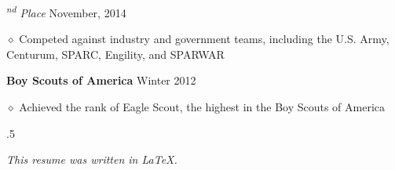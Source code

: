 \documentclass[executivepaper]{extarticle}
\begin{document}
\begin{center}
{\begin{minipage}{7.0in}
{\noindent \textit{\fontsize{12}{8}\textsuperscript{nd} Place}} {\hfill \fontsize{10}{8}\selectfont November, 2014}

\vspace{0.25mm}

{\noindent $\diamond$ {\fontsize{12}{8}\selectfont Competed against industry and government teams, including the U.S. Army, Centurum, SPARC, Engility, and SPARWAR}}

\vspace{2mm}

{\noindent \textbf{\fontsize{12}{8}\selectfont Boy Scouts of America}} {\hfill \fontsize{10}{8}\selectfont Winter 2012}

\vspace{0.25mm}

{\noindent $\diamond$ {\fontsize{12}{8}\selectfont Achieved the rank of Eagle Scout, the highest in the Boy Scouts of America}}

\vspace{5mm}



\moveleft.5\hoffset\centerline{{\large\sl This resume was written in \LaTeX.}}

\end{minipage}

}

\end{center}
\end{document}

